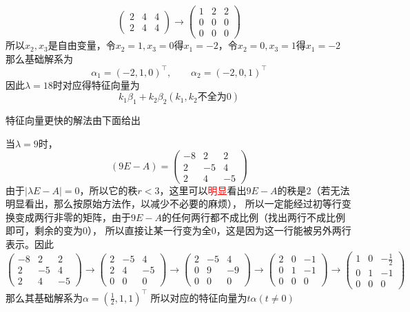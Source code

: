 \begin{solution}
\[\begin{pmatrix}
            2 & 4 & 4 \\
            2 & 4 & 4
        \end{pmatrix}
        \longrightarrow
        \begin{pmatrix}
            1 & 2 & 2 \\
            0 & 0 & 0 \\
            0 & 0 & 0
        \end{pmatrix}
    \]
    所以$x_2,x_3$是自由变量，令$x_2=1,x_3=0$得$x_1=-2$，令$x_2=0,x_3=1$得$x_1=-2$
    那么基础解系为
    \[
        \alpha_1 = (-2,1,0)^\intercal,\qquad \alpha_2 = (-2,0,1)^\intercal
    \]
    因此$\lambda = 18$时对应得特征向量为
    \[ k_1\beta_1 + k_2\beta_2 (k_1,k_2\text{不全为}0) \]
\end{solution}

特征向量更快的解法由下面给出
\begin{solution}
    当$\lambda=9$时，
    \[
        (9E-A) =
        \begin{pmatrix}
            -8 & 2  & 2  \\
            2  & -5 & 4  \\
            2  & 4  & -5
        \end{pmatrix}
    \]
    由于$|\lambda E - A|=0$，所以它的秩$r<3$，这里可以\textcolor{red}{明显}看出$9E-A$的秩是$2$（若无法明显看出，那么按原始方法作，以减少不必要的麻烦），
    所以一定能经过初等行变换变成两行非零的矩阵，由于$9E-A$的任何两行都不成比例（找出两行不成比例即可，剩余的变为$0$），
    所以直接让某一行变为全$0$，这是因为这一行能被另外两行表示。因此
    \[
        \begin{pmatrix}
            -8 & 2  & 2  \\
            2  & -5 & 4  \\
            2  & 4  & -5
        \end{pmatrix}
        \longrightarrow
        \begin{pmatrix}
            2 & -5 & 4  \\
            2 & 4  & -5 \\
            0 & 0  & 0
        \end{pmatrix}
        \longrightarrow
        \begin{pmatrix}
            2 & -5 & 4  \\
            0 & 9  & -9 \\
            0 & 0  & 0
        \end{pmatrix}
        \longrightarrow
        \begin{pmatrix}
            2 & 0 & -1 \\
            0 & 1 & -1 \\
            0 & 0 & 0
        \end{pmatrix}
        \longrightarrow
        \begin{pmatrix}
            1 & 0 & -\frac{1}{2} \\
            0 & 1 & -1           \\
            0 & 0 & 0
        \end{pmatrix}
    \]
    那么其基础解系为$\alpha = (\frac{1}{2},1,1)^\intercal$
    所以对应的特征向量为$t\alpha (t\neq 0)$
\end{solution}

